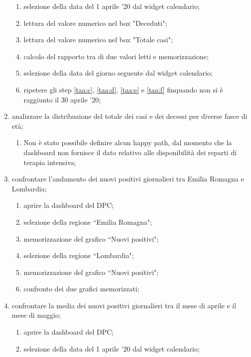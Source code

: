 \begin{enumerate}
\begin{enumerate}[label=\alph*.]
        \item selezione della data del 1 aprile '20 dal widget calendario;
        \item lettura del valore numerico nel box "Deceduti"; \label{taa:c}
        \item lettura del valore numerico nel box "Totale casi"; \label{taa:d}
        \item calcolo del rapporto tra di due valori letti e memorizzazione; \label{taa:e}
        \item selezione della data del giorno seguente dal widget calendario; \label{taa:f}
        \item ripetere gli step \ref{taa:c}, \ref{taa:d}, \ref{taa:e} e \ref{taa:f} finquando non si è raggiunto il 30 aprile '20;
    \end{enumerate}
    \item analizzare la distribuzione del totale dei casi e dei decessi per diverse fasce di età;
    \begin{enumerate}[label=\alph*.]
        \item  Non è stato possibile definire alcun happy path, dal momento che la dashboard non fornisce il dato relativo alle disponibilità dei reparti di terapia intensiva;
    \end{enumerate}
    \item confrontare l'andamento dei nuovi positivi giornalieri tra Emilia Romagna e Lombardia;
    \begin{enumerate}[label=\alph*.]
        \item aprire la dashboard del DPC;
        \item selezione della regione ``Emilia Romagna";
        \item memorizzazione del grafico ``Nuovi positivi";
        \item selezione della regione ``Lombardia";
        \item memorizzazione del grafico ``Nuovi positivi";
        \item confronto dei due grafici memorizzati;
    \end{enumerate}
    \item confrontare la media dei nuovi positivi giornalieri tra il mese di aprile e il mese di maggio;
    \begin{enumerate}[label=\alph*.]
        \item aprire la dashboard del DPC;
        \item selezione della data del 1 aprile '20 dal widget calendario; \label{at:b}

\end{enumerate}
\end{enumerate}
